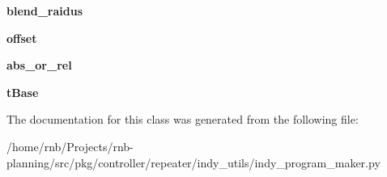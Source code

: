 \begin{DoxyCompactItemize}
\item 
\mbox{\label{classrnb-planning_1_1src_1_1pkg_1_1controller_1_1repeater_1_1indy__utils_1_1indy__program__maker_1_1_move_param_a43d195025ec22ad673ad8195510cb125}} 
{\bfseries blend\+\_\+raidus}
\item 
\mbox{\label{classrnb-planning_1_1src_1_1pkg_1_1controller_1_1repeater_1_1indy__utils_1_1indy__program__maker_1_1_move_param_a7b74bc57a012c502481a26f7baba0306}} 
{\bfseries offset}
\item 
\mbox{\label{classrnb-planning_1_1src_1_1pkg_1_1controller_1_1repeater_1_1indy__utils_1_1indy__program__maker_1_1_move_param_ad7f52f2d320b185cb759a9a7d4a89696}} 
{\bfseries abs\+\_\+or\+\_\+rel}
\item 
\mbox{\label{classrnb-planning_1_1src_1_1pkg_1_1controller_1_1repeater_1_1indy__utils_1_1indy__program__maker_1_1_move_param_aa53392f2273abe611bd54ce81d33178d}} 
{\bfseries t\+Base}
\end{DoxyCompactItemize}


The documentation for this class was generated from the following file\+:\begin{DoxyCompactItemize}
\item 
/home/rnb/\+Projects/rnb-\/planning/src/pkg/controller/repeater/indy\+\_\+utils/indy\+\_\+program\+\_\+maker.\+py\end{DoxyCompactItemize}
